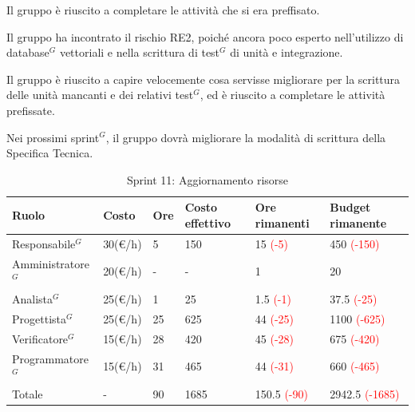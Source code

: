 Il gruppo è riuscito a completare le attività che si era preffisato.

Il gruppo ha incontrato il rischio RE2, poiché ancora poco esperto nell'utilizzo di database$^G$ vettoriali e nella scrittura di test$^G$ di unità e integrazione.

Il gruppo è riuscito a capire velocemente cosa servisse migliorare per la scrittura delle unità mancanti e dei relativi test$^G$, ed è riuscito a completare le attività prefissate.

Nei prossimi sprint$^G$, il gruppo dovrà migliorare la modalità di scrittura della Specifica Tecnica.

\begin{table}[H]
	\centering
	\begin{tabular}{|p{}|p{}|p{}|p{}|p{}|p{}|}
		\hline
		\rowcolor{gray!25}
		Ruolo & Costo & Ore & Costo \newline effettivo & Ore \newline rimanenti & Budget \newline rimanente \\ \hline
		
		Responsabile$^G$
		& 30(€/h) & 5 & 150
		& 15 \textcolor{red}{(-5)}
		& 450 \textcolor{red}{(-150)} \\ \hline
		
		Amministratore$^G$
		& 20(€/h) & - & -
		& 1
		& 20 \\ \hline
		
		Analista$^G$
		& 25(€/h) & 1 & 25
		& 1.5 \textcolor{red}{(-1)}
		& 37.5 \textcolor{red}{(-25)} \\ \hline
		
		Progettista$^G$
		& 25(€/h) & 25 & 625 
		& 44 \textcolor{red}{(-25)}
		& 1100 \textcolor{red}{(-625)}\\ \hline
		
		Verificatore$^G$
		& 15(€/h) & 28 & 420 
		& 45 \textcolor{red}{(-28)}
		& 675 \textcolor{red}{(-420)} \\ \hline
		
		Programmatore$^G$
		& 15(€/h) & 31 & 465 
		& 44 \textcolor{red}{(-31)}
		& 660 \textcolor{red}{(-465)} \\ \hline
		
		Totale
		& - & 90 & 1685
		& 150.5 \textcolor{red}{(-90)}
		& 2942.5 \newline \textcolor{red}{(-1685)} \\ \hline
	\end{tabular}
	\caption{Sprint 11: Aggiornamento risorse}
\end{table}
